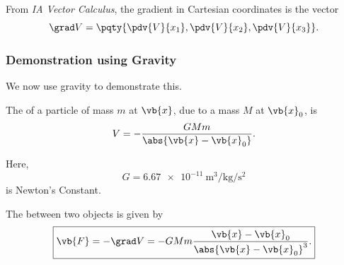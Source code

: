From \textit{IA Vector Calculus}, the gradient in Cartesian coordinates is the vector
\begin{equation}
    \grad V = \pqty{\pdv{V}{x_1}, \pdv{V}{x_2}, \pdv{V}{x_3}}.
\end{equation}

\subsubsection{Demonstration using Gravity}

We now use gravity to demonstrate this.

\begin{definition}
    \label{def:gpe}%
    The  of a particle of mass \(m\) at \(\vb{x}\), due to a mass \(M\) at \(\vb{x}_0\), is
    \begin{equation}
        V = - \frac{G M m}{\abs{\vb{x} - \vb{x}_0}}.
    \end{equation}
\end{definition}

Here,
\begin{equation}
    G = \SI{6.67e-11}{\metre\cubed\per\kilogram\per\second\squared}
\end{equation}
is Newton's Constant.

\begin{proposition}
    \label{prop:gravitational-force}%
    The  between two objects is given by
    \begin{equation}
        \boxed{\vb{F} = - \grad V = - G M m \frac{\vb{x} - \vb{x}_0}{\abs{\vb{x} - \vb{x}_0}^3}.}
    \end{equation}
\end{proposition}

